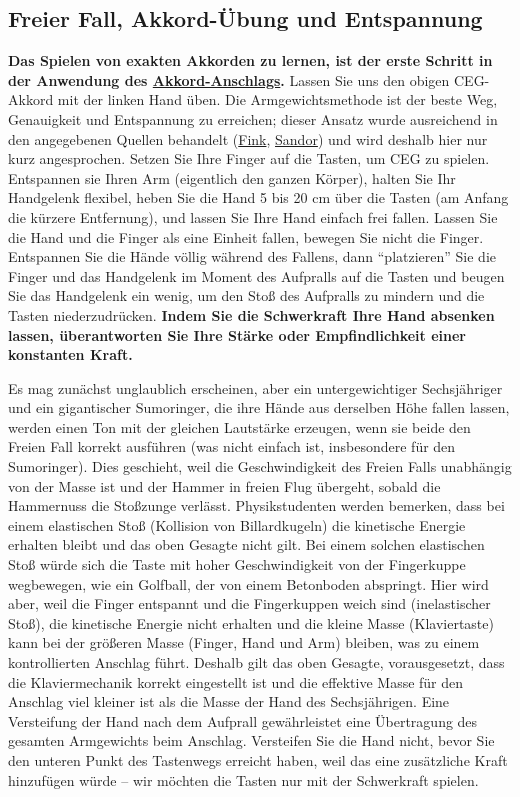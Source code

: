 
\subsection{Freier Fall, Akkord-Übung und Entspannung}
\label{c1ii10}

\textbf{Das Spielen von exakten Akkorden zu lernen, ist der erste Schritt in der Anwendung des \hyperref[c1ii9]{Akkord-Anschlags}.}
Lassen Sie uns den obigen CEG-Akkord mit der linken Hand üben.
Die Armgewichtsmethode ist der beste Weg, Genauigkeit und Entspannung zu erreichen; dieser Ansatz wurde ausreichend in den angegebenen Quellen behandelt (\hyperref[Fink]{Fink}, \hyperref[Sandor]{Sandor}) und wird deshalb hier nur kurz angesprochen.
Setzen Sie Ihre Finger auf die Tasten, um CEG zu spielen.
Entspannen sie Ihren Arm (eigentlich den ganzen Körper), halten Sie Ihr Handgelenk flexibel, heben Sie die Hand 5 bis 20 cm über die Tasten (am Anfang die kürzere Entfernung), und lassen Sie Ihre Hand einfach frei fallen.
Lassen Sie die Hand und die Finger als eine Einheit fallen, bewegen Sie nicht die Finger.
Entspannen Sie die Hände völlig während des Fallens, dann \enquote{platzieren} Sie die Finger und das Handgelenk im Moment des Aufpralls auf die Tasten und beugen Sie das Handgelenk ein wenig, um den Stoß des Aufpralls zu mindern und die Tasten niederzudrücken.
\textbf{Indem Sie die Schwerkraft Ihre Hand absenken lassen, überantworten Sie Ihre Stärke oder Empfindlichkeit einer konstanten Kraft.}

Es mag zunächst unglaublich erscheinen, aber ein untergewichtiger Sechsjähriger und ein gigantischer Sumoringer, die ihre Hände aus derselben Höhe fallen lassen, werden einen Ton mit der gleichen Lautstärke erzeugen, wenn sie beide den Freien Fall korrekt ausführen (was nicht einfach ist, insbesondere für den Sumoringer).
Dies geschieht, weil die Geschwindigkeit des Freien Falls unabhängig von der Masse ist und der Hammer in freien Flug übergeht, sobald die Hammernuss die Stoßzunge verlässt.
Physikstudenten werden bemerken, dass bei einem elastischen Stoß (Kollision von Billardkugeln) die kinetische Energie erhalten bleibt und das oben Gesagte nicht gilt.
Bei einem solchen elastischen Stoß würde sich die Taste mit hoher Geschwindigkeit von der Fingerkuppe wegbewegen, wie ein Golfball, der von einem Betonboden abspringt.
Hier wird aber, weil die Finger entspannt und die Fingerkuppen weich sind (inelastischer Stoß), die kinetische Energie nicht erhalten und die kleine Masse (Klaviertaste) kann bei der größeren Masse (Finger, Hand und Arm) bleiben, was zu einem kontrollierten Anschlag führt.
Deshalb gilt das oben Gesagte, vorausgesetzt, dass die Klaviermechanik korrekt eingestellt ist und die effektive Masse für den Anschlag viel kleiner ist als die Masse der Hand des Sechsjährigen.
Eine Versteifung der Hand nach dem Aufprall gewährleistet eine Übertragung des gesamten Armgewichts beim Anschlag.
Versteifen Sie die Hand nicht, bevor Sie den unteren Punkt des Tastenwegs erreicht haben, weil das eine zusätzliche Kraft hinzufügen würde -- wir möchten die Tasten nur mit der Schwerkraft spielen.

